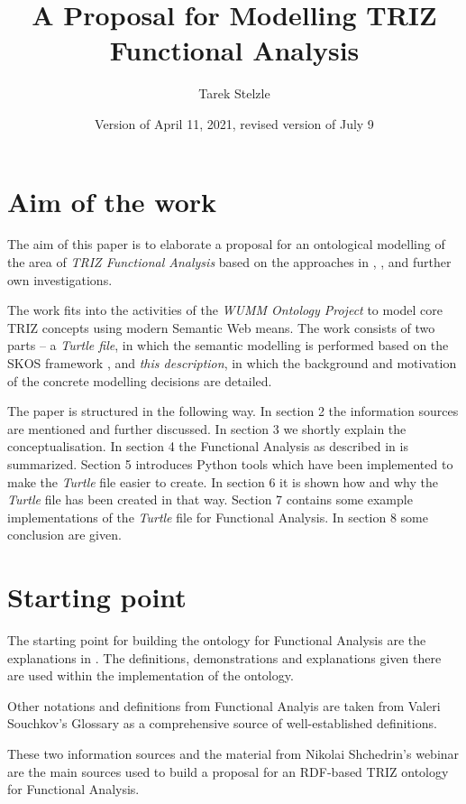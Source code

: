 \documentclass[11pt,a4paper]{article}
\title{A Proposal for Modelling TRIZ Functional Analysis}
\author{Tarek Stelzle}
\date{Version of April 11, 2021, revised version of July 9}
\begin{document}
\maketitle
\tableofcontents
\clearpage

\section{Aim of the work}

The aim of this paper is to elaborate a proposal for an ontological modelling
of the area of \emph{TRIZ Functional Analysis} based on the approaches in
\cite{KS}, \cite{WebinarFunctionAnalysis}, \cite{SouchkovGlossary} and further
own investigations.

The work fits into the activities of the \emph{WUMM Ontology Project}
\cite{WUMM} to model core TRIZ concepts using modern Semantic Web means.  The
work consists of two parts -- a \emph{Turtle file}, in which the semantic
modelling is performed based on the SKOS framework \cite{SKOS}, and \emph{this
  description}, in which the background and motivation of the concrete
modelling decisions are detailed.

The paper is structured in the following way.  In section 2 the information
sources are mentioned and further discussed.  In section 3 we shortly explain
the conceptualisation.  In section 4 the Functional Analysis as described in
\cite{KS} is summarized.  Section 5 introduces Python tools which have been
implemented to make the \emph{Turtle} file easier to create.  In section 6 it
is shown how and why the \emph{Turtle} file has been created in that way.
Section 7 contains some example implementations of the \emph{Turtle} file for
Functional Analysis.  In section 8 some conclusion are given.

\section{Starting point} 
\label{sec:starting_point}

The starting point for building the ontology for Functional Analysis are the
explanations in \cite{KS}.  The definitions, demonstrations and explanations
given there are used within the implementation of the ontology.

Other notations and definitions from Functional Analyis are taken from Valeri
Souchkov's Glossary \cite{SouchkovGlossary} as a comprehensive source of
well-established definitions.

These two information sources and the material from Nikolai Shchedrin's
webinar \cite{WebinarFunctionAnalysis} are the main sources used to build a
proposal for an RDF-based TRIZ ontology for Functional Analysis.
\end{document}
